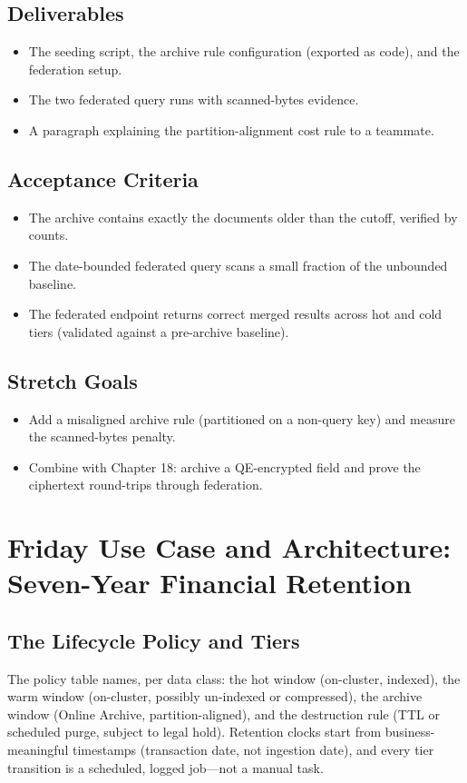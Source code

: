 \subsection*{Deliverables}
\begin{itemize}
    \item The seeding script, the archive rule configuration (exported as code), and the federation setup.
    \item The two federated query runs with scanned-bytes evidence.
    \item A paragraph explaining the partition-alignment cost rule to a teammate.
\end{itemize}

\subsection*{Acceptance Criteria}
\begin{itemize}
    \item The archive contains exactly the documents older than the cutoff, verified by counts.
    \item The date-bounded federated query scans a small fraction of the unbounded baseline.
    \item The federated endpoint returns correct merged results across hot and cold tiers (validated against a pre-archive baseline).
\end{itemize}

\subsection*{Stretch Goals}
\begin{itemize}
    \item Add a misaligned archive rule (partitioned on a non-query key) and measure the scanned-bytes penalty.
    \item Combine with Chapter 18: archive a QE-encrypted field and prove the ciphertext round-trips through federation.
\end{itemize}

\section{Friday Use Case and Architecture: Seven-Year Financial Retention}
\subsection{The Lifecycle Policy and Tiers}
The policy table names, per data class: the hot window (on-cluster, indexed), the warm window (on-cluster, possibly un-indexed or compressed), the archive window (Online Archive, partition-aligned), and the destruction rule (TTL or scheduled purge, subject to legal hold). Retention clocks start from business-meaningful timestamps (transaction date, not ingestion date), and every tier transition is a scheduled, logged job---not a manual task.

